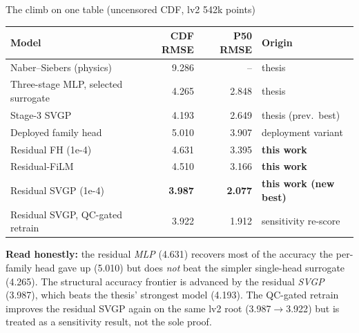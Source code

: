 \documentclass[UTF8,aspectratio=169]{ctexbeamer}
\newcommand{\good}[1]{\textcolor{green!45!black}{#1}}
\begin{document}
\begin{frame}{The climb on one table (uncensored CDF, lv2 542k points)}
\small
\begin{center}
\renewcommand{\arraystretch}{1.18}
\setlength{\tabcolsep}{6pt}
\begin{tabular}{@{}lrrl@{}}
\toprule
\textbf{Model} & \textbf{CDF RMSE} & \textbf{P50 RMSE} & \textbf{Origin} \\
\midrule
Naber--Siebers (physics)            & 9.286 & -- & thesis \\
Three-stage MLP, selected surrogate & 4.265 & 2.848 & thesis \\
Stage-3 SVGP                        & 4.193 & 2.649 & thesis (prev.\ best) \\
\midrule
Deployed family head                & 5.010 & 3.907 & deployment variant \\
Residual FH (1e-4)                  & 4.631 & 3.395 & \textbf{this work} \\
Residual-FiLM                       & 4.510 & 3.166 & \textbf{this work} \\
\rowcolor{winrow}
Residual SVGP (1e-4)                & \textbf{3.987} & \textbf{2.077} & \textbf{this work (new best)} \\
Residual SVGP, QC-gated retrain     & 3.922 & 1.912 & sensitivity re-score \\
\bottomrule
\end{tabular}
\end{center}
\vspace{0.3em}
\footnotesize
\textbf{Read honestly:} the residual \emph{MLP} (4.631) recovers most of the accuracy
the per-family head gave up (5.010) but does \emph{not} beat the simpler single-head
surrogate (4.265). The structural accuracy frontier is advanced by the residual
\emph{SVGP} (\good{3.987}), which beats the thesis' strongest model (4.193). The
QC-gated retrain improves the residual SVGP again on the same lv2 root
(\good{3.987$\to$3.922}) but is treated as a sensitivity result, not the sole proof.
\end{frame}
\end{document}
